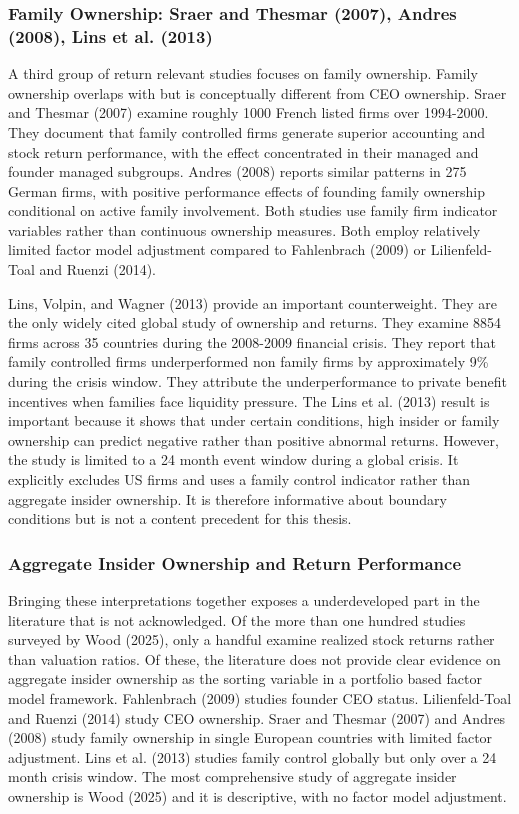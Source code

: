 \subsubsection{Family Ownership: Sraer and Thesmar (2007), Andres (2008), Lins et al. (2013)}

A third group of return relevant studies focuses on family ownership. Family ownership overlaps with but is conceptually different from CEO ownership. Sraer and Thesmar (2007) examine roughly 1000 French listed firms over 1994-2000. They document that family controlled firms generate superior accounting and stock return performance, with the effect concentrated in their managed and founder managed subgroups. Andres (2008) reports similar patterns in 275 German firms, with positive performance effects of founding family ownership conditional on active family involvement. Both studies use family firm indicator variables rather than continuous ownership measures. Both employ relatively limited factor model adjustment compared to Fahlenbrach (2009) or Lilienfeld-Toal and Ruenzi (2014).

Lins, Volpin, and Wagner (2013) provide an important counterweight. They are the only widely cited global study of ownership and returns. They examine 8854 firms across 35 countries during the 2008-2009 financial crisis. They report that family controlled firms underperformed non family firms by approximately 9\% during the crisis window. They attribute the underperformance to private benefit incentives when families face liquidity pressure. The Lins et al. (2013) result is important because it shows that under certain conditions, high insider or family ownership can predict negative rather than positive abnormal returns. However, the study is limited to a 24 month event window during a global crisis. It explicitly excludes US firms and uses a family control indicator rather than aggregate insider ownership. It is therefore informative about boundary conditions but is not a content precedent for this thesis.


\subsubsection{Aggregate Insider Ownership and Return Performance}

Bringing these interpretations together exposes a underdeveloped part in the literature that is not acknowledged. Of the more than one hundred studies surveyed by Wood (2025), only a handful examine realized stock returns rather than valuation ratios. Of these, the literature does not provide clear evidence on aggregate insider ownership as the sorting variable in a portfolio based factor model framework. Fahlenbrach (2009) studies founder CEO status. Lilienfeld-Toal and Ruenzi (2014) study CEO ownership. Sraer and Thesmar (2007) and Andres (2008) study family ownership in single European countries with limited factor adjustment. Lins et al. (2013) studies family control globally but only over a 24 month crisis window. The most comprehensive study of aggregate insider ownership is Wood (2025) and it is descriptive, with no factor model adjustment.

